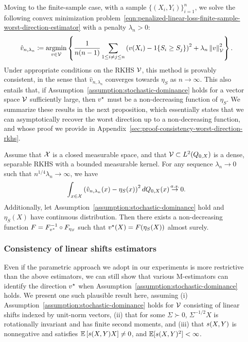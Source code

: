 Moving to the finite-sample case, with a sample $\{(X_i,Y_i) \}_{i=1}^n$,  we solve the following convex minimization problem~\eqref{eqn:penalized-linear-loss-finite-sample-worst-direction-estimator} with a penalty $\lambda_n > 0$:
\begin{align*}
\hat{v}_{n,  \lambda_n} \coloneqq \mathop{\rm argmin}_{v \in \mathcal{V}} \left\{ \frac{1}{n(n-1)} \sum_{1\le i \neq j \le n} \left( v(X_i) - 1\!\left\{S_i \ge S_j\right\} \right)^2  + \lambda_n \left\|{v}\right\|_{\mathcal{V}}^2 \right\}.
\end{align*}
Under appropriate conditions on the RKHS $\mathcal{V}$, this method is provably consistent, in the sense that $\hat{v}_{n,  \lambda_n}$ converges towards $\eta_S$ as $n \to \infty$.
This also entails that, if Assumption~\ref{assumption:stochastic-dominance} holds for a vector space $\mathcal{V}$ sufficiently large,  then $v^\star$ must be a non-decreasing function of $\eta_S$. 
We summarize these results in the next proposition,  which essentially states that we can asymptotically recover the worst direction up to a non-decreasing function, and whose proof we provide in Appendix~\ref{sec:proof-consistency-worst-direction-rkhs}.

\begin{proposition}
  \label{prop:consistency-worst-direction-rkhs}
  Assume that $\mathcal{X}$ is a closed measurable space, and that $\mathcal{V}\subset
  L^2(Q_{0,X})$ is a dense, separable RKHS with a bounded measurable kernel.
  For any sequence $\lambda_n \to 0$ such that $n^{1/4}\lambda_n \to
  \infty$, we have
  \begin{align*}
    \int_{x \in \mathcal{X}} \left( \hat{v}_{n,  \lambda_n}(x) - \eta_S(x) \right)^2 dQ_{0,X}(x) \mathop{\stackrel{a.s.}{\rightarrow}} 0.
  \end{align*}
  Additionally, let Assumption~\ref{assumption:stochastic-dominance} hold
  and $\eta_S(X)$ have continuous distribution. Then there exists a
  non-decreasing function $F = F_{v^\star}^{-1} \circ F_{\eta_S}$ such that
  $v^\star(X)= F(\eta_S(X))$ almost surely.
\end{proposition}

\subsubsection{Consistency of linear shifts estimators}
\label{subsec:consistency-linear-shift-estimator}

Even if the parametric approach we adopt in our experiments is more restrictive than the above estimators, we can
still show that various M-estimators can identify the direction $v^\star$ when
Assumption~\ref{assumption:stochastic-dominance} holds.  We present one such
plausible result here, assuming (i)
Assumption~\ref{assumption:stochastic-dominance} holds for $\mathcal{V}$
consisting of linear shifts indexed by unit-norm vectors,
(ii) that for
some $\Sigma \succ 0$, $\Sigma^{-1/2} X$ is
rotationally invariant and has finite second moments,
and (iii) that
$s(X, Y)$ is nonnegative and satisfies
$\mathbb{E}\left[ s(X,Y)X\right] \neq 0$, and
$\mathbb{E}[ s(X,Y)^2] < \infty$.

